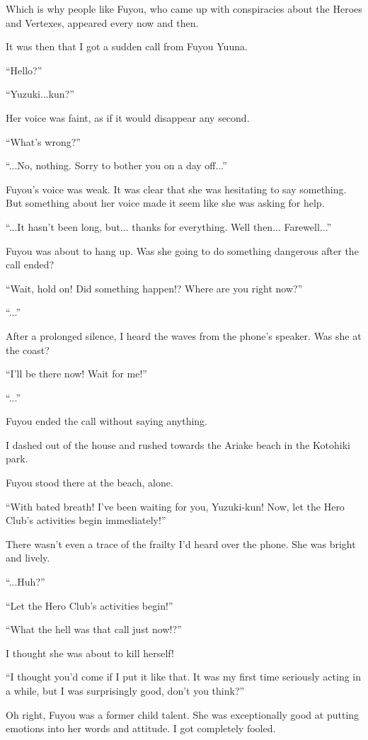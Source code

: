 Which is why people like Fuyou, who came up with conspiracies about the Heroes and Vertexes, appeared every now and then.

It was then that I got a sudden call from Fuyou Yuuna.

``Hello?''

``Yuzuki...kun?''

Her voice was faint, as if it would disappear any second.

``What's wrong?''

``...No, nothing. Sorry to bother you on a day off...''

Fuyou's voice was weak. It was clear that she was hesitating to say something. But something about her voice made it seem like she was asking for help.

``...It hasn't been long, but... thanks for everything. Well then... Farewell...''

Fuyou was about to hang up. Was she going to do something dangerous after the call ended?

``Wait, hold on! Did something happen!? Where are you right now?''

``...''

After a prolonged silence, I heard the waves from the phone's speaker. Was she at the coast?

``I'll be there now! Wait for me!''

``...''

Fuyou ended the call without saying anything.

I dashed out of the house and rushed towards the Ariake beach in the Kotohiki park.

Fuyou stood there at the beach, alone.

``With bated breath! I've been waiting for you, Yuzuki-kun! Now, let the Hero Club's activities begin immediately!''

There wasn't even a trace of the frailty I'd heard over the phone. She was bright and lively.

``...Huh?''

``Let the Hero Club's activities begin!''

``What the hell was that call just now!?''

I thought she was about to kill herself!

``I thought you'd come if I put it like that. It was my first time seriously acting in a while, but I was surprisingly good, don't you think?''

Oh right, Fuyou was a former child talent. She was exceptionally good at putting emotions into her words and attitude. I got completely fooled.

